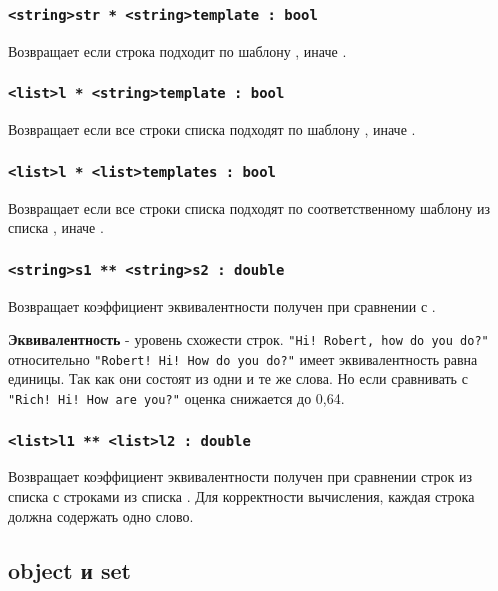 \documentclass[a4paper, 14pt]{extarticle}
\begin{document}
\subsubsection{\lstinline`<string>str * <string>template : bool`}
	Возвращает  если строка  подходит по шаблону , иначе .

\subsubsection{\lstinline`<list>l * <string>template : bool`}
	Возвращает  если все строки списка  подходят по шаблону , иначе .

\subsubsection{\lstinline`<list>l * <list>templates : bool`}
	Возвращает  если все строки списка  подходят по соответственному шаблону из списка , иначе .

\subsubsection{\lstinline`<string>s1 ** <string>s2 : double`}
	Возвращает коэффициент эквивалентности получен при сравнении  с .
	
	{\bf Эквивалентность} - уровень схожести строк. \lstinline`"Hi! Robert, how do you do?"` относительно \lstinline`"Robert! Hi! How do you do?"` имеет эквивалентность равна единицы. Так как они состоят из одни и те же слова. Но если сравнивать с  \lstinline`"Rich! Hi! How are you?"` оценка снижается до 0,64.

\subsubsection{\lstinline`<list>l1 ** <list>l2 : double`}
	Возвращает коэффициент эквивалентности получен при сравнении строк из списка  с строками из списка .
	Для корректности вычисления, каждая строка должна содержать одно слово.

\subsection{{\color{bluemarin}object} и {\color{bluemarin}set}}
\end{document}

